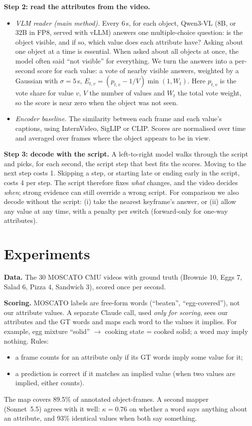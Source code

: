 \documentclass[10pt]{article}
\begin{document}
\textbf{Step 2: read the attributes from the video.}
\begin{itemize}
\item \emph{VLM reader (main method).} Every 6\,s, for each object, Qwen3-VL (8B, or 32B in FP8, served with vLLM) answers one multiple-choice question: is the object visible, and if so, which value does each attribute have? Asking about one object at a time is essential. When asked about all objects at once, the model often said ``not visible'' for everything. We turn the answers into a per-second score for each value: a vote of nearby visible answers, weighted by a Gaussian with $\sigma = 5$\,s, $E_{t,v}=(p_{t,v}-1/V)\min(1,W_t)$. Here $p_{t,v}$ is the vote share for value $v$, $V$ the number of values and $W_t$ the total vote weight, so the score is near zero when the object was not seen.
\item \emph{Encoder baseline.} The similarity between each frame and each value's captions, using InternVideo, SigLIP or CLIP. Scores are normalised over time and averaged over frames where the object appears to be in view.
\end{itemize}

\textbf{Step 3: decode with the script.} A left-to-right model walks through the script and picks, for each second, the script step that best fits the scores. Moving to the next step costs 1. Skipping a step, or starting late or ending early in the script, costs 4 per step. The script therefore fixes \emph{what} changes, and the video decides \emph{when}; strong evidence can still override a wrong script. For comparison we also decode without the script: (i) take the nearest keyframe's answer, or (ii) allow any value at any time, with a penalty per switch (forward-only for one-way attributes).

\section{Experiments}
\textbf{Data.} The 30 MOSCATO CMU videos with ground truth (Brownie 10, Eggs 7, Salad 6, Pizza 4, Sandwich 3), scored once per second.

\textbf{Scoring.} MOSCATO labels are free-form words (``beaten'', ``egg-covered''), not our attribute values. A separate Claude call, used \emph{only for scoring}, sees our attributes and the GT words and maps each word to the values it implies. For example, egg mixture ``solid'' $\to$ cooking state = cooked solid; a word may imply nothing. Rules:
\begin{itemize}
\item a frame counts for an attribute only if its GT words imply some value for it;
\item a prediction is correct if it matches an implied value (when two values are implied, either counts).
\end{itemize}
The map covers 89.5\% of annotated object-frames. A second mapper (Sonnet~5.5) agrees with it well: $\kappa = 0.76$ on whether a word says anything about an attribute, and 93\% identical values when both say something.
\end{document}
